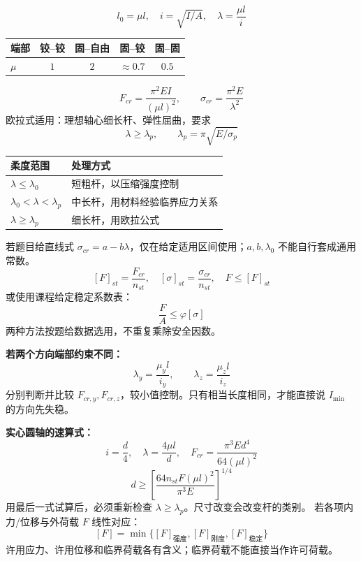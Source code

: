 \documentclass[a4paper,10pt,fontset=none]{ctexart}
\begin{document}
\clearpage
{}
\begin{leftcol}
\[
l_0=\mu l,\quad i=\sqrt{I/A},\quad
\boxed{\lambda=\frac{\mu l}{i}}
\]
\par\begin{tabularx}{\linewidth}{@{}Xcccc@{}}
\toprule
端部 & 铰--铰 & 固--自由 & 固--铰 & 固--固\\\midrule
$\mu$ & $1$ & $2$ & $\approx0.7$ & $0.5$\\\bottomrule
\end{tabularx}\par
\[
\boxed{F_{cr}=\frac{\pi^2EI}{(\mu l)^2}},\qquad
\sigma_{cr}=\frac{\pi^2E}{\lambda^2}
\]
欧拉式适用：理想轴心细长杆、弹性屈曲，要求
\[
\lambda\ge\lambda_p,\qquad
\boxed{\lambda_p=\pi\sqrt{E/\sigma_p}}
\]
\par\begin{tabularx}{\linewidth}{@{}lX@{}}
\toprule
柔度范围 & 处理方式\\\midrule
$\lambda\le\lambda_0$ & 短粗杆，以压缩强度控制\\
$\lambda_0<\lambda<\lambda_p$ & 中长杆，用材料经验临界应力关系\\
$\lambda\ge\lambda_p$ & 细长杆，用欧拉公式\\\bottomrule
\end{tabularx}\par
若题目给直线式 $\sigma_{cr}=a-b\lambda$，仅在给定适用区间使用；$a,b,\lambda_0$ 不能自行套成通用常数。
\[
[F]_{st}=\frac{F_{cr}}{n_{st}},\quad
[\sigma]_{st}=\frac{\sigma_{cr}}{n_{st}},\quad
\boxed{F\le[F]_{st}}
\]
或使用课程给定稳定系数表：
\[
\frac FA\le\varphi[\sigma]
\]
两种方法按题给数据选用，不重复乘除安全因数。

\textbf{若两个方向端部约束不同：}
\[
\lambda_y=\frac{\mu_y l}{i_y},\qquad
\lambda_z=\frac{\mu_z l}{i_z}
\]
分别判断并比较 $F_{cr,y},F_{cr,z}$，较小值控制。只有相当长度相同，才能直接说 $I_{\min}$ 的方向先失稳。

\textbf{实心圆轴的速算式：}
\[
i=\frac d4,\quad \lambda=\frac{4\mu l}{d},\quad
F_{cr}=\frac{\pi^3Ed^4}{64(\mu l)^2}
\]
\[
d\ge\left[\frac{64n_{st}F(\mu l)^2}{\pi^3E}\right]^{1/4}
\]
用最后一式试算后，必须重新检查 $\lambda\ge\lambda_p$。尺寸改变会改变杆的类别。
若各项内力/位移与外荷载 $F$ 线性对应：
\[
[F]=\min\{[F]_{\text{强度}},[F]_{\text{刚度}},[F]_{\text{稳定}}\}
\]
许用应力、许用位移和临界荷载各有含义；临界荷载不能直接当作许可荷载。
\end{leftcol}
\end{document}
